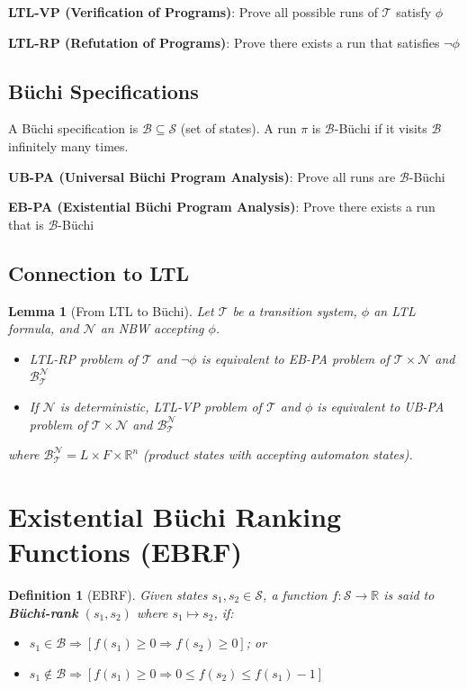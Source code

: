 \documentclass{article}
\newtheorem{definition}{Definition}
\newtheorem{lemma}{Lemma}
\begin{document}
\begin{enumerate}
\textbf{LTL-VP (Verification of Programs)}: Prove all possible runs of $\mathcal{T}$ satisfy $\phi$

\textbf{LTL-RP (Refutation of Programs)}: Prove there exists a run that satisfies $\neg\phi$

\subsection{Büchi Specifications}

A Büchi specification is $\mathcal{B} \subseteq \mathcal{S}$ (set of states). A run $\pi$ is $\mathcal{B}$-Büchi if it visits $\mathcal{B}$ infinitely many times.

\textbf{UB-PA (Universal Büchi Program Analysis)}: Prove all runs are $\mathcal{B}$-Büchi

\textbf{EB-PA (Existential Büchi Program Analysis)}: Prove there exists a run that is $\mathcal{B}$-Büchi

\subsection{Connection to LTL}

\begin{lemma}[From LTL to Büchi]
Let $\mathcal{T}$ be a transition system, $\phi$ an LTL formula, and $\mathcal{N}$ an NBW accepting $\phi$.
\begin{itemize}
    \item LTL-RP problem of $\mathcal{T}$ and $\neg\phi$ is equivalent to EB-PA problem of $\mathcal{T} \times \mathcal{N}$ and $\mathcal{B}_{\mathcal{T}}^{\mathcal{N}}$
    \item If $\mathcal{N}$ is deterministic, LTL-VP problem of $\mathcal{T}$ and $\phi$ is equivalent to UB-PA problem of $\mathcal{T} \times \mathcal{N}$ and $\mathcal{B}_{\mathcal{T}}^{\mathcal{N}}$
\end{itemize}
where $\mathcal{B}_{\mathcal{T}}^{\mathcal{N}} = L \times F \times \mathbb{R}^n$ (product states with accepting automaton states).
\end{lemma}

\section{Existential Büchi Ranking Functions (EBRF)}

\begin{definition}[EBRF]
Given states $s_1, s_2 \in \mathcal{S}$, a function $f: \mathcal{S} \rightarrow \mathbb{R}$ is said to \textbf{Büchi-rank} $(s_1, s_2)$ where $s_1 \mapsto s_2$, if:
\begin{itemize}
    \item $s_1 \in \mathcal{B} \Rightarrow [f(s_1) \geq 0 \Rightarrow f(s_2) \geq 0]$; or
    \item $s_1 \notin \mathcal{B} \Rightarrow [f(s_1) \geq 0 \Rightarrow 0 \leq f(s_2) \leq f(s_1) - 1]$
\end{itemize}


\end{definition}
\end{enumerate}
\end{document}
